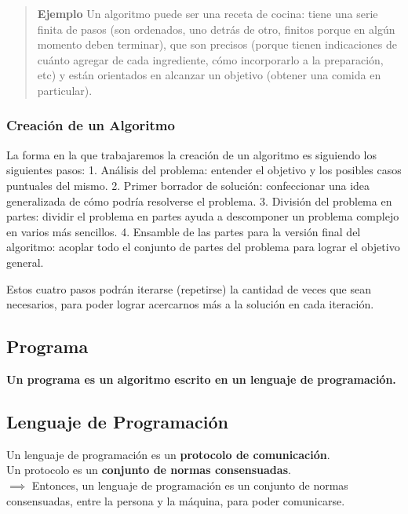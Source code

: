 \documentclass[
  letterpaper,
  DIV=11,
  numbers=noendperiod]{scrreprt}
\begin{document}
\begin{quote}
\textbf{Ejemplo} Un algoritmo puede ser una receta de cocina: tiene una
serie finita de pasos (son ordenados, uno detrás de otro, finitos porque
en algún momento deben terminar), que son precisos (porque tienen
indicaciones de cuánto agregar de cada ingrediente, cómo incorporarlo a
la preparación, etc) y están orientados en alcanzar un objetivo (obtener
una comida en particular).
\end{quote}

\hypertarget{creaciuxf3n-de-un-algoritmo}{%
\subsubsection{Creación de un
Algoritmo}\label{creaciuxf3n-de-un-algoritmo}}

La forma en la que trabajaremos la creación de un algoritmo es siguiendo
los siguientes pasos: 1. Análisis del problema: entender el objetivo y
los posibles casos puntuales del mismo. 2. Primer borrador de solución:
confeccionar una idea generalizada de cómo podría resolverse el
problema. 3. División del problema en partes: dividir el problema en
partes ayuda a descomponer un problema complejo en varios más sencillos.
4. Ensamble de las partes para la versión final del algoritmo: acoplar
todo el conjunto de partes del problema para lograr el objetivo general.

Estos cuatro pasos podrán iterarse (repetirse) la cantidad de veces que
sean necesarios, para poder lograr acercarnos más a la solución en cada
iteración.

\hypertarget{programa}{%
\subsection{Programa}\label{programa}}

\textbf{Un programa es un algoritmo escrito en un lenguaje de
programación.}

\hypertarget{lenguaje-de-programaciuxf3n}{%
\subsection{Lenguaje de
Programación}\label{lenguaje-de-programaciuxf3n}}

Un lenguaje de programación es un \textbf{protocolo de comunicación}.\\
Un protocolo es un \textbf{conjunto de normas consensuadas}.\\
\(\implies\) Entonces, un lenguaje de programación es un conjunto de
normas consensuadas, entre la persona y la máquina, para poder
comunicarse.
\end{document}
